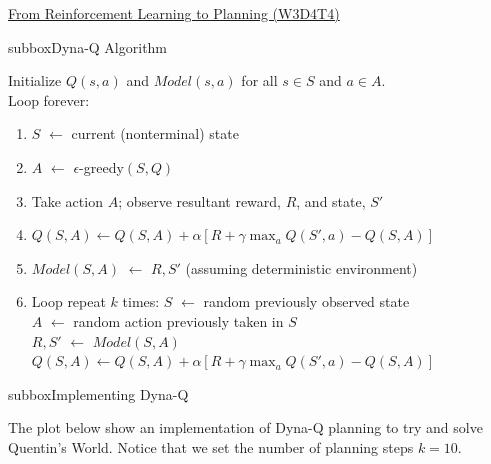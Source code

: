 \begin{textbox}{\href{https://compneuro.neuromatch.io/tutorials/W3D4_ReinforcementLearning/student/W3D4_Tutorial4.html}{From Reinforcement Learning to Planning (W3D4T4)} }

\begin{subbox}{subbox}{Dyna-Q Algorithm}
\scriptsize

Initialize $Q(s,a)$ and $Model(s,a)$ for all $s \in S$ and $a \in A$.\\
Loop forever:\\
\begin{enumerate}[label=(\alph*)]
    \item 
 $S$ $\leftarrow$ current (nonterminal) state 
 \item  $A$ $\leftarrow$ $\epsilon$-greedy$(S,Q)$ 
   \item  Take action $A$; observe resultant reward, $R$, and state, $S'$ 
   \item  $Q(S,A)\leftarrow Q(S,A) + \alpha \left[R + \gamma \max_{a} Q(S',a) - Q(S,A)\right]$ 
   \item  $Model(S,A)$ $\leftarrow$ $R,S'$ (assuming deterministic environment) 
   \item  Loop repeat $k$ times: 
 $S$ $\leftarrow$ random previously observed state \\
 $A$ $\leftarrow$ random action previously taken in $S$ \\
 $R,S'$ $\leftarrow$ $Model(S,A)$ \\
 $Q(S,A) \leftarrow Q(S,A) + \alpha \left[R + \gamma \max_{a} Q(S',a) - Q(S,A)\right]$ 
\end{enumerate}

\end{subbox}

\begin{subbox}{subbox}{Implementing Dyna-Q}
\scriptsize

The plot below show an implementation of Dyna-Q  planning to try and solve Quentin's World. Notice that we set the number of planning steps $k=10$.
\begin{center}
    

\end{center}
\end{subbox}
\end{textbox}
